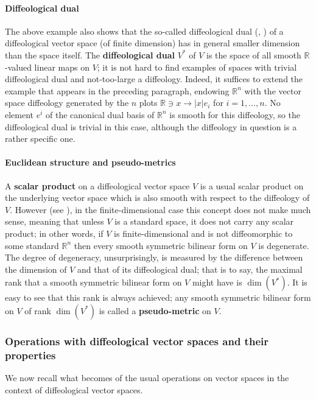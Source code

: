 \documentclass{article}
\newcommand\matR{{\mathbb{R}}}
\begin{document}
\paragraph{Diffeological dual} The above example also shows that the so-called diffeological dual (\cite{vincent}, \cite{wu}) of a diffeological vector space (of finite dimension) has in general smaller 
dimension than the space itself. The \textbf{diffeological dual} $V^*$ of $V$ is the space of all smooth $\matR$-valued linear maps on $V$; it is not hard to find examples of spaces with trivial diffeological 
dual and not-too-large a diffeology. Indeed, it suffices to extend the example that appears in the preceding paragraph, endowing $\matR^n$ with the vector space diffeology generated by the $n$ plots 
$\matR\ni x\to |x|e_i$ for $i=1,\ldots,n$. No element $e^i$ of the canonical dual basis of $\matR^n$ is smooth for this diffeology, so the diffeological dual is trivial in this case, although the diffeology in question 
is a rather specific one.

\paragraph{Euclidean structure and pseudo-metrics} A \textbf{scalar product} on a diffeological vector space $V$ is a usual scalar product on the underlying vector space which is also smooth with respect 
to the diffeology of $V$. However (see \cite{iglesiasBook}), in the finite-dimensional case this concept does not make much sense, meaning that unless $V$ is a standard space, it does not carry any scalar 
product; in other words, if $V$ is finite-dimensional and is not diffeomorphic to some standard $\matR^n$ then every smooth symmetric bilinear form on $V$ is degenerate. The degree of degeneracy, 
unsurprisingly, is measured by the difference between the dimension of $V$ and that of its diffeological dual; that is to say, the maximal rank that a smooth symmetric bilinear form on $V$ might have is 
$\dim(V^*)$. It is easy to see that this rank is always achieved; any smooth symmetric bilinear form on $V$ of rank $\dim(V^*)$ is called a \textbf{pseudo-metric} on $V$.


\subsubsection{Operations with diffeological vector spaces and their properties}

We now recall what becomes of the usual operations on vector spaces in the context of diffeological vector spaces.
\end{document}
